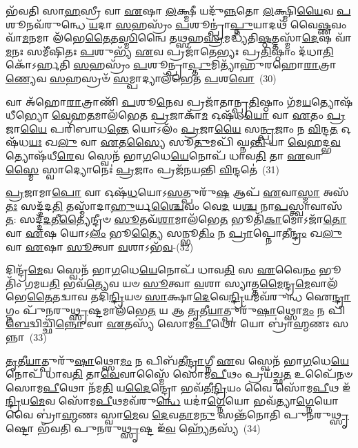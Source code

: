 𑌭᳴𑌵𑌤𑌿 𑌸𑌾\-\ul{𑌹}\-𑌸𑍍𑌰𑍀 𑌵𑌾 \ul{𑌏}\-𑌷𑌾 \ul{𑌲}\-𑌕𑍍𑌷𑍍𑌮𑍀 𑌯𑌦𑍁᳴\-\ul{𑌨𑍍𑌨}\-𑌤𑍋 \ul{𑌲}\-𑌕𑍍𑌷𑍍𑌮𑌿\-\ul{𑌯𑍈}\-𑌵 \ul{𑌪}\-𑌶𑍂𑌨𑌵᳴\-𑌰𑍁𑌨𑍍𑌧𑍇 \ul{𑌯}\-𑌦𑌾 \ul{𑌸}\-𑌹𑌸𑍍𑌰𑌂᳴ \ul{𑌪}\-𑌶𑍂𑌨𑍍𑌪𑍍𑌰𑌾॑\-\ul{𑌪𑍍𑌨𑍁}\-𑌯𑌾𑌦𑌥᳴ 𑌵𑍈\-\ul{𑌷𑍍𑌣}\-𑌵𑌂 𑌵𑌾᳴\-\ul{𑌮}\-𑌨𑌮𑌾 𑌲᳴𑌭𑍇\-\ul{𑌤𑍈}\-𑌤\-\ul{𑌸𑍍𑌮𑌿}\-𑌨𑍍𑌵𑍈 𑌤\-\ul{𑌥𑍍𑌸}\-𑌹\-\ul{𑌸𑍍𑌰}\-𑌮𑌦𑍍𑌧𑍍𑌯᳴𑌤𑌿\-\ul{𑌷𑍍𑌠}\-𑌤𑍍𑌤𑌸𑍍𑌮𑌾᳴\-\ul{𑌦𑍇}\-𑌷 𑌵𑌾᳴\-\ul{𑌮}\-𑌨𑌃 𑌸𑌮𑍀᳴𑌷𑌿𑌤𑌃 \ul{𑌪}\-𑌶𑍁𑌭𑍍𑌯᳴ \ul{𑌏}\-𑌵 𑌪𑍍𑌰𑌜𑌾᳴𑌤𑍇𑌭𑍍𑌯𑌃 𑌪𑍍𑌰\-\ul{𑌤𑌿}\-𑌷𑍍𑌠𑌾𑌂 𑌦᳴𑌧𑌾\-\ul{𑌤𑌿} 𑌕𑍋᳴\-𑌽𑌰𑍍\mbox{}𑌹𑌤𑌿 \ul{𑌸}\-𑌹𑌸𑍍𑌰𑌂᳴ \ul{𑌪}\-𑌶𑍂𑌨𑍍𑌪𑍍𑌰𑌾\-\ul{𑌪𑍍𑌤𑍁}\-𑌮𑌿𑌤𑍍𑌯𑌾᳴𑌹𑍁𑌰𑌹𑍋\-\ul{𑌰𑌾}\-𑌤𑍍𑌰𑌾\-\ul{𑌣𑍍𑌯𑍇}\-𑌵 \ul{𑌸}\-𑌹𑌸𑍍𑌰𑍞᳴ \ul{𑌸}\-𑌮𑍍𑌪𑌾𑌦𑍍𑌯𑌾𑌲᳴𑌭𑍇𑌤 \ul{𑌪}\-𑌶\-\ul{𑌵𑍋}\-~(30)

𑌵𑌾 𑌅᳴𑌹𑍋\-\ul{𑌰𑌾}\-𑌤𑍍𑌰𑌾𑌣𑌿᳴ \ul{𑌪}\-𑌶𑍂\-\ul{𑌨𑍇}\-𑌵 𑌪𑍍𑌰𑌜𑌾᳴𑌤𑌾𑌨𑍍𑌪𑍍𑌰\-\ul{𑌤𑌿}\-𑌷𑍍𑌠𑌾𑌂 𑌗᳴𑌮\-\ul{𑌯}\-𑌤𑍍𑌯𑍋𑌷᳴𑌧𑍀𑌭𑍍𑌯𑍋 \ul{𑌵𑍇}\-𑌹\-\ul{𑌤}\-𑌮𑌾𑌲᳴𑌭𑍇𑌤 \ul{𑌪𑍍𑌰}\-𑌜𑌾𑌕𑌾᳴\-\ul{𑌮} 𑌓𑌷᳴𑌧\-\ul{𑌯𑍋} 𑌵𑌾 \ul{𑌏}\-𑌤𑌂 \ul{𑌪𑍍𑌰}\-𑌜𑌾\-\ul{𑌯𑍈} 𑌪𑌰𑌿᳴𑌬𑌾𑌧\-\ul{𑌨𑍍𑌤𑍇} 𑌯𑍋\-𑌽𑌲𑌂᳴ \ul{𑌪𑍍𑌰}\-𑌜𑌾\-\ul{𑌯𑍈} 𑌸\-\ul{𑌨𑍍𑌪𑍍𑌰}\-𑌜𑌾𑌂 𑌨 \ul{𑌵𑌿}\-𑌨𑍍𑌦\-\ul{𑌤} 𑌓𑌷᳴𑌧\-\ul{𑌯𑌃} 𑌖\-\ul{𑌲𑍁} 𑌵𑌾 \ul{𑌏}\-𑌤\-\ul{𑌸𑍍𑌯𑍈} 𑌸𑍂\-\ul{𑌤𑍁}\-𑌮𑌪𑌿᳴ 𑌘𑍍𑌨\-\ul{𑌨𑍍𑌤𑌿} 𑌯𑌾 \ul{𑌵𑍇}\-𑌹𑌦𑍍𑌭\-\ul{𑌵}\-𑌤𑍍𑌯𑍋𑌷᳴𑌧𑍀\-\ul{𑌰𑍇}\-𑌵 𑌸𑍍𑌵𑍇𑌨᳴ 𑌭𑌾\-\ul{𑌗}\-𑌧𑍇\-\ul{𑌯𑍇}\-𑌨𑍋𑌪᳴ 𑌧𑌾𑌵\-\ul{𑌤𑌿} 𑌤𑌾 \ul{𑌏}\-𑌵𑌾\-\ul{𑌸𑍍𑌮𑍈} 𑌸𑍍𑌵𑌾𑌦𑍍𑌯𑍋𑌨𑍇𑌃॑ \ul{𑌪𑍍𑌰}\-𑌜𑌾𑌂 𑌪𑍍𑌰𑌜᳴𑌨𑌯𑌨𑍍𑌤𑌿 \ul{𑌵𑌿}\-𑌨𑍍𑌦𑌤𑍇॑~(31)

\-\ul{𑌪𑍍𑌰}\-𑌜𑌾𑌮𑌾\-\ul{𑌪𑍋} 𑌵𑌾 𑌓𑌷᳴\-\ul{𑌧}\-𑌯𑍋\-𑌽\-\ul{𑌸}\-𑌤𑍍𑌪𑍁𑌰𑍁᳴\-\ul{𑌷} 𑌆𑌪᳴ \ul{𑌏}\-𑌵𑌾\-\ul{𑌸𑍍𑌮𑌾} 𑌅𑌸᳴\-\ul{𑌤𑌃} 𑌸𑌦𑍍𑌦᳴𑌦\-\ul{𑌤𑌿} 𑌤𑌸𑍍𑌮𑌾᳴𑌦𑌾\-\ul{𑌹𑍁}\-𑌰𑍍𑌯\-\ul{𑌶𑍍𑌚𑍈}\-𑌵𑌂 𑌵𑍇\-\ul{𑌦} 𑌯\-\ul{𑌶𑍍𑌚} 𑌨𑌾\-\ul{𑌪}\-𑌸𑍍𑌤𑍍𑌵𑌾𑌵𑌾𑌸᳴\-\ul{𑌤}\-: 𑌸𑌦𑍍𑌦᳴\-\ul{𑌦}\-𑌤𑍀\-\ul{𑌤𑍍𑌯𑍈}\-𑌨𑍍𑌦𑍍𑌰𑍀𑍞 \ul{𑌸𑍂}\-𑌤𑌵᳴\-\ul{𑌶𑌾}\-𑌮𑌾\-𑌲᳴𑌭𑍇\-\ul{𑌤} 𑌭𑍂𑌤𑌿᳴\-\ul{𑌕𑌾}\-𑌮𑍋\-𑌽𑌜𑌾᳴\-\ul{𑌤𑍋} 𑌵𑌾 \ul{𑌏}\-𑌷 𑌯𑍋\-𑌽\-\ul{𑌲𑌂} 𑌭𑍂\-\ul{𑌤𑍍𑌯𑍈} 𑌸𑌨𑍍𑌭𑍂\-\ul{𑌤𑌿𑌂} 𑌨 \ul{𑌪𑍍𑌰𑌾}\-𑌪𑍍𑌨𑍋𑌤𑍀\-\ul{𑌨𑍍𑌦𑍍𑌰𑌂} 𑌖\-\ul{𑌲𑍁} 𑌵𑌾 \ul{𑌏}\-𑌷𑌾 \ul{𑌸𑍂}\-𑌤𑍍𑌵𑌾 \ul{𑌵}\-𑌶𑌾\-𑌽𑌭᳴\-\ul{𑌵}\--(32)

𑌦𑌿𑌨𑍍𑌦𑍍𑌰᳴\-\ul{𑌮𑍇}\-𑌵 𑌸𑍍𑌵𑍇𑌨᳴ 𑌭𑌾\-\ul{𑌗}\-𑌧𑍇\-\ul{𑌯𑍇}\-𑌨𑍋𑌪᳴ 𑌧𑌾𑌵\-\ul{𑌤𑌿} 𑌸 \ul{𑌏}\-𑌵𑍈\-\ul{𑌨𑌂} 𑌭𑍂𑌤𑌿𑌂᳴ 𑌗𑌮𑌯\-\ul{𑌤𑌿} 𑌭𑌵᳴\-\ul{𑌤𑍍𑌯𑍇}\-𑌵 𑌯𑍞 \ul{𑌸𑍂}\-𑌤𑍍𑌵𑌾 \ul{𑌵}\-𑌶𑌾 𑌸𑍍𑌯𑌾𑌤𑍍𑌤\-\ul{𑌮𑍈}\-𑌨𑍍𑌦𑍍𑌰\-\ul{𑌮𑍇}\-𑌵𑌾𑌲᳴𑌭𑍇\-\ul{𑌤𑍈}\-𑌤𑌦𑍍𑌵𑌾𑌵 𑌤𑌦𑌿᳴\-\ul{𑌨𑍍𑌦𑍍𑌰𑌿}\-𑌯𑍞 \ul{𑌸𑌾}\-𑌕𑍍𑌷𑌾\-\ul{𑌦𑍇}\-𑌵𑍇\-\ul{𑌨𑍍𑌦𑍍𑌰𑌿}\-𑌯𑌮𑌵᳴𑌰𑍁𑌨𑍍𑌧 𑌐\-\ul{𑌨𑍍𑌦𑍍𑌰𑌾}\-𑌗𑍍𑌨𑌂 𑌪𑍁᳴𑌨𑌰𑍁\-\ul{𑌥𑍍𑌸𑍃}\-𑌷𑍍𑌟𑌮𑌾\-𑌲᳴𑌭𑍇\-\ul{𑌤} 𑌯 𑌆 \ul{𑌤𑍃}\-𑌤𑍀\-\ul{𑌯𑌾}\-𑌤𑍍𑌪𑍁𑌰𑍁᳴\-\ul{𑌷𑌾}\-𑌥𑍍𑌸𑍋\-\ul{𑌮𑌂} 𑌨 𑌪𑌿\-\ul{𑌬𑍇}\-𑌦𑍍𑌵𑌿𑌚𑍍𑌛𑌿᳴\-\ul{𑌨𑍍𑌨𑍋} 𑌵𑌾 \ul{𑌏}\-𑌤𑌸𑍍𑌯᳴ 𑌸𑍋𑌮\-\ul{𑌪𑍀}\-𑌥𑍋 𑌯𑍋 𑌬𑍍𑌰𑌾॑\-\ul{𑌹𑍍𑌮}\-𑌣𑌃 𑌸𑌨𑍍𑌨𑌾~(33)

\-\ul{𑌤𑍃}\-𑌤𑍀\-\ul{𑌯𑌾}\-𑌤𑍍𑌪𑍁𑌰𑍁᳴\-\ul{𑌷𑌾}\-𑌥𑍍𑌸𑍋\-\ul{𑌮𑌂} 𑌨 𑌪𑌿𑌬᳴𑌤𑍀\-\ul{𑌨𑍍𑌦𑍍𑌰𑌾}\-𑌗𑍍𑌨𑍀 \ul{𑌏}\-𑌵 𑌸𑍍𑌵𑍇𑌨᳴ 𑌭𑌾\-\ul{𑌗}\-𑌧𑍇\-\ul{𑌯𑍇}\-𑌨𑍋𑌪᳴ 𑌧𑌾𑌵\-\ul{𑌤𑌿} 𑌤𑌾\-\ul{𑌵𑍇}\-𑌵𑌾𑌸𑍍𑌮𑍈᳴ 𑌸𑍋𑌮\-\ul{𑌪𑍀}\-𑌥𑌂 𑌪𑍍𑌰𑌯᳴𑌚𑍍𑌛\-\ul{𑌤} 𑌉𑌪𑍈᳴𑌨𑍞 𑌸𑍋𑌮\-\ul{𑌪𑍀}\-𑌥𑍋 𑌨᳴𑌮\-\ul{𑌤𑌿} 𑌯\-\ul{𑌦𑍈}\-𑌨𑍍𑌦𑍍𑌰𑍋 𑌭𑌵᳴𑌤𑍀\-\ul{𑌨𑍍𑌦𑍍𑌰𑌿}\-𑌯𑌂 𑌵𑍈 𑌸𑍋᳴𑌮\-\ul{𑌪𑍀}\-𑌥 𑌇᳴\-\ul{𑌨𑍍𑌦𑍍𑌰𑌿}\-𑌯\-\ul{𑌮𑍇}\-𑌵 𑌸𑍋᳴𑌮\-\ul{𑌪𑍀}\-𑌥𑌮𑌵᳴\-𑌰𑍁\-\ul{𑌨𑍍𑌧𑍇} 𑌯𑌦𑌾॑\-\ul{𑌗𑍍𑌨𑍇}\-𑌯𑍋 𑌭𑌵᳴𑌤𑍍𑌯𑌾\-\ul{𑌗𑍍𑌨𑍇}\-𑌯𑍋 𑌵𑍈 𑌬𑍍𑌰𑌾॑\-\ul{𑌹𑍍𑌮}\-𑌣𑌃 𑌸𑍍𑌵𑌾\-\ul{𑌮𑍇}\-𑌵 \ul{𑌦𑍇}\-𑌵\-\ul{𑌤𑌾}\-𑌮\-\ul{𑌨𑍁} 𑌸𑌨𑍍𑌤᳴𑌨𑍋𑌤𑌿 𑌪𑍁𑌨𑌰𑍁\-\ul{𑌥𑍍𑌸𑍃}\-𑌷𑍍𑌟𑍋 𑌭᳴𑌵𑌤𑌿 𑌪𑍁𑌨𑌰𑍁\-\ul{𑌥𑍍𑌸𑍃}\-𑌷𑍍𑌟 𑌇᳴\-\ul{𑌵} 𑌹𑍍𑌯𑍇᳴𑌤𑌸𑍍𑌯᳴~(34)

